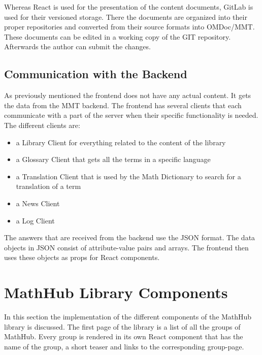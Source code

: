 \documentclass[11pt,a4paper]{article}
\begin{document}
Whereas React is used for the presentation of the content documents, GitLab is used for their versioned storage.
There the documents are organized into their proper repositories and converted from their source formats into OMDoc/MMT.
These documents can be edited in a working copy of the GIT repository.
Afterwards the author can submit the changes.

\subsection{Communication with the Backend}

As previously mentioned the frontend does not have any actual content.
It gets the data from the MMT backend.
The frontend has several clients that each communicate with a part of the server when their specific functionality is needed.
The different clients are:
\begin{itemize}
\item a Library Client for everything related to the content of the library
\item a Glossary Client that gets all the terms in a specific language
\item a Translation Client that is used by the Math Dictionary to search for a translation of a term 
\item a News Client
\item a Log Client
\end{itemize}

The answers that are received from the backend use the JSON format.
The data objects in JSON consist of attribute-value pairs and arrays.
The frontend then uses these objects as props for React components.


\section{MathHub Library Components}
In this section the implementation of the different components of the MathHub library is discussed.
The first page of the library is a list of all the groups of MathHub.
Every group is rendered in its own React component that has the name of the group, a short teaser and links to the corresponding group-page.
\end{document}
